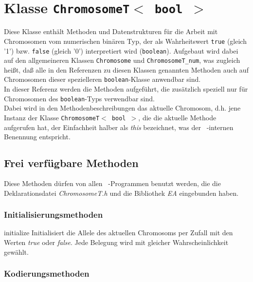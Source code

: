 \documentclass{report}
\begin{document}
\setNormalInstance

\noindent
\chapter{Klasse {\tt ChromosomeT$<$ bool $>$}}
Diese Klasse enth\"alt Methoden und Datenstrukturen f\"ur die Arbeit
mit Chromosomen vom numerischen bin\"aren Typ, der als
Wahrheitswert {\tt true} (gleich '1') bzw. {\tt false} (gleich '0')
interpretiert wird ({\tt boolean}).
Aufgebaut wird dabei auf den allgemeineren Klassen {\tt Chromosome}
und {\tt ChromosomeT\_num},
was zugleich hei{\ss}t, da{\ss} alle in den Referenzen zu diesen Klassen
genannten Methoden auch auf Chromosomen dieser spezielleren
{\tt boolean}-Klasse anwendbar sind.\\
In dieser Referenz werden die Methoden aufgef\"uhrt, die zus\"atzlich speziell
nur f\"ur Chromosomen des {\tt boolean}-Typs verwendbar sind. \\
Dabei wird in
den Methodenbeschreibungen das aktuelle Chromosom, d.h. jene Instanz der Klasse
{\tt ChromosomeT$<$ bool $>$}, die die aktuelle Methode aufgerufen hat, 
der Einfachheit halber als {\em this} bezeichnet, was der \cpp\ -internen 
Benennung entspricht.

\newpage
\section{Frei verf\"ugbare Methoden}
Diese Methoden d\"urfen von allen \cpp\ -Programmen benutzt werden, die
die Deklarationsdatei {\em ChromosomeT.h} und die Bibliothek {\em EA}
eingebunden haben.

\subsection{Initialisierungsmethoden}

\setNormalInstance
\printEmptyMethod
{initialize}
{Initialisiert die Allele des aktuellen Chromosoms per Zufall mit
    den Werten {\em true} oder {\em false}. Jede Belegung wird mit 
    gleicher Wahrscheinlichkeit gew\"ahlt.}

\newpage
\subsection{Kodierungsmethoden}
\end{document}
